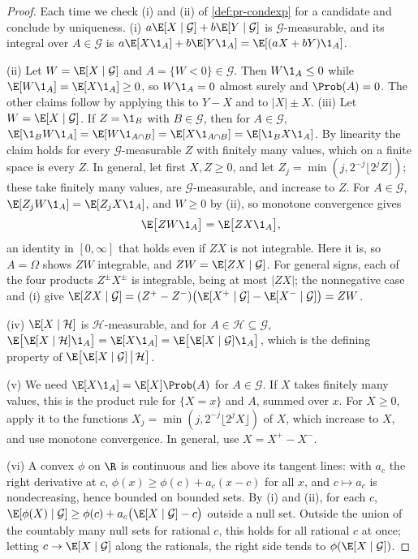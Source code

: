 \begin{proof}
Each time we check (i) and (ii) of \cref{def:pr-condexp} for a candidate and conclude by
uniqueness. (i) $a\E[X\mid\mathcal G]+b\E[Y\mid\mathcal G]$ is $\mathcal G$-measurable, and its integral
over $A\in\mathcal G$ is $a\E[X\1_A]+b\E[Y\1_A]=\E[(aX+bY)\1_A]$.

(ii) Let $W=\E[X\mid\mathcal G]$ and $A=\{W<0\}\in\mathcal G$. Then $W\1_A\le0$ while
$\E[W\1_A]=\E[X\1_A]\ge0$, so $W\1_A=0$ almost surely and $\Prob(A)=0$. The other claims
follow by applying this to $Y-X$ and to $|X|\pm X$. (iii) Let $W=\E[X\mid\mathcal G]$. If $Z=\1_B$ with $B\in\mathcal G$, then for
$A\in\mathcal G$, $\E[\1_BW\1_A]=\E[W\1_{A\cap B}]=\E[X\1_{A\cap B}]=\E[\1_BX\1_A]$. By
linearity the claim holds for every $\mathcal G$-measurable $Z$ with finitely many values,
which on a finite space is every $Z$. In general, let first $X,Z\ge0$, and let
$Z_j=\min(j,2^{-j}\lfloor2^jZ\rfloor)$; these take finitely many values, are
$\mathcal G$-measurable, and increase to $Z$. For $A\in\mathcal G$,
$\E[Z_jW\1_A]=\E[Z_jX\1_A]$, and $W\ge0$ by (ii), so monotone convergence gives
\begin{equation}\label{eq:pr-takeout-positive}
  \E\big[ZW\1_A\big]=\E\big[ZX\1_A\big],
\end{equation}
an identity in $[0,\infty]$ that holds even if $ZX$ is not integrable. Here it is, so
$A=\Omega$ shows $ZW$ integrable, and $ZW=\E[ZX\mid\mathcal G]$. For general signs, each of
the four products $Z^\pm X^\pm$ is integrable, being at most $|ZX|$; the nonnegative case
and (i) give $\E[ZX\mid\mathcal G]=(Z^+-Z^-)\big(\E[X^+\mid\mathcal G]-\E[X^-\mid\mathcal G]\big)
=ZW$.

(iv) $\E[X\mid\mathcal H]$ is $\mathcal H$-measurable, and for $A\in\mathcal H\subseteq\mathcal G$,
$\E\big[\E[X\mid\mathcal H]\1_A\big]=\E[X\1_A]=\E\big[\E[X\mid\mathcal G]\1_A\big]$, which is
the defining property of $\E\big[\E[X\mid\mathcal G]\,\big|\,\mathcal H\big]$.

(v) We need $\E[X\1_A]=\E[X]\Prob(A)$ for $A\in\mathcal G$. If $X$ takes finitely many
values, this is the product rule for $\{X=x\}$ and $A$, summed over $x$. For $X\ge0$, apply
it to the functions $X_j=\min(j,2^{-j}\lfloor2^jX\rfloor)$ of $X$, which increase to $X$,
and use monotone convergence. In general, use $X=X^+-X^-$.

(vi) A convex $\phi$ on $\R$ is continuous and lies above its tangent lines: with $a_c$ the
right derivative at $c$, $\phi(x)\ge\phi(c)+a_c(x-c)$ for all $x$, and $c\mapsto a_c$ is
nondecreasing, hence bounded on bounded sets. By (i) and (ii), for each $c$,
$\E[\phi(X)\mid\mathcal G]\ge\phi(c)+a_c\big(\E[X\mid\mathcal G]-c\big)$ outside a null set.
Outside the union of the countably many null sets for rational $c$, this holds for all
rational $c$ at once; letting $c\to\E[X\mid\mathcal G]$ along the rationals, the right side
tends to $\phi(\E[X\mid\mathcal G])$.
\end{proof}

